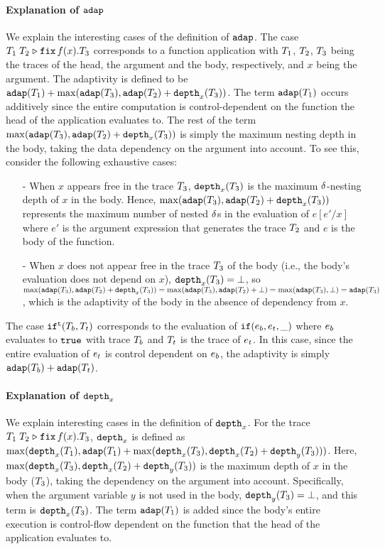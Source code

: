 \documentclass[a4paper,11pt]{article}
\theoremstyle{definition}
\begin{document}
\paragraph{Explanation of $\mathtt{adap}$}
We explain the interesting cases of the definition of $\mathtt{adap}$. The
case $T_1 \; T_2 \mathrel{\triangleright} {\mathop{\mathtt{fix}} f(x).T_3}$ corresponds to a function
application with $T_1$, $T_2$, $T_3$ being the traces of the
head, the argument and the body, respectively, and $x$ being the
argument. The adaptivity is defined to be $\mathtt{adap}(T_1) +
\max(\mathtt{adap}(T_3), \mathtt{adap}(T_2) + \mathtt{depth}_{x}(T_3))$. The term
$\mathtt{adap}(T_1)$ occurs additively since the entire computation is
control-dependent on the function the head of the application
evaluates to. The rest of the term $\max(\mathtt{adap}(T_3), \mathtt{adap}(T_2) +
\mathtt{depth}_{x}(T_3))$ is simply the maximum nesting depth in the body,
taking the data dependency on the argument into account. To see this,
consider the following exhaustive cases:
\begin{itemize}
  \item[-] When $x$ appears free in the trace $T_3$,
    $\mathtt{depth}_{x}(T_3)$ is the maximum $\delta$-nesting depth of $x$ in
    the body. Hence, $\max(\mathtt{adap}(T_3), \mathtt{adap}(T_2) +
    \mathtt{depth}_{x}(T_3))$ represents the maximum number of nested $\delta$s
    in the evaluation of $e[e'/x]$ where $e'$ is the argument
    expression that generates the trace $T_2$ and $e$ is the body of
    the function.
  \item[-] When $x$ does not appear free in the trace $T_3$ of the
    body (i.e., the body's evaluation does not depend on $x$),
    $\mathtt{depth}_{x}(T_3) = \bot$, so $\max(\mathtt{adap}(T_3), \mathtt{adap}(T_2) +
    \mathtt{depth}_{x}(T_3)) = \max(\mathtt{adap}(T_3), \mathtt{adap}(T_2) + \bot) =
    \max(\mathtt{adap}(T_3), \bot) = \mathtt{adap}(T_3)$, which is the adaptivity
    of the body in the absence of dependency from $x$.
\end{itemize}

The case $\mathtt{if}^{\mathtt{t}}(T_b, T_t)$ corresponds to the evaluation of
$\mathtt{if}(e_b, e_t, \_)$ where $e_b$ evaluates to $\mathtt{true}$
with trace $T_b$ and $T_t$ is the trace of $e_t$. In this
case, since the entire evaluation of $e_t$ is control dependent on
$e_b$, the adaptivity is simply $\mathtt{adap}(T_b) + \mathtt{adap}(T_t)$.

\paragraph{Explanation of $\mathtt{depth}_{x}$}
We explain interesting cases in the definition of $\mathtt{depth}_{x}$.  For the
trace $T_1 \; T_2 \mathrel{\triangleright} {\mathop{\mathtt{fix}} f(x).T_3}$, $\mathtt{depth}_{x}$ is defined as
$\max(\mathtt{depth}_{x}(T_1), \mathtt{adap}(T_1) + \max(\mathtt{depth}_{x}(T_3),
\mathtt{depth}_{x}(T_2) + \mathtt{depth}_{y}(T_3)))$. Here, $\max(\mathtt{depth}_{x}(T_3),
\mathtt{depth}_{x}(T_2) + \mathtt{depth}_{y}(T_3))$ is the maximum depth of $x$ in the
body ($T_3$), taking the dependency on the argument into
account. Specifically, when the argument variable $y$ is not used in
the body, $\mathtt{depth}_{y}(T_3) = \bot$, and this term is
$\mathtt{depth}_{x}(T_3)$.  The term $\mathtt{adap}(T_1)$ is added since the body's
entire execution is control-flow dependent on the function that the
head of the application evaluates to.
\end{document}
